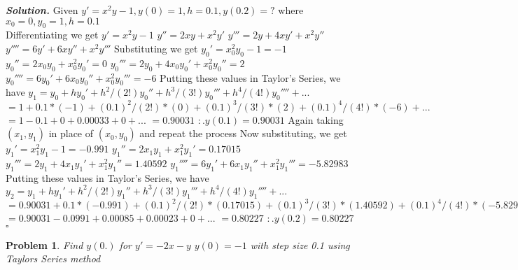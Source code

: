 \documentclass[12pt]{article}
\newtheorem{problem}{Problem}
\newenvironment{solution}[1][\it{Solution}]{\textbf{#1. } }{$\square$}
\begin{document}
\begin{solution}
    Given \(y'=x^2y-1, y(0)=1, h=0.1, y(0.2)=?\) where \(x_0=0,y_0=1,h=0.1\) \\ Differentiating we get \newline
    \(y'=x^2y-1\) \newline
    \(y''=2xy+x^2y'\) \newline
    \(y'''=2y+4xy'+x^2y''\) \newline
    \(y''''=6y'+6xy''+x^2y'''\) \newline
    Substituting we get 
    \(y_0'=x_0^2y_0-1=-1\) \newline
    \(y_0''=2x_0y_0+x_0^2y_0'=0\) \newline
    \(y_0'''=2y_0+4x_0y_0'+x_0^2y_0''=2\) \newline
    \(y_0''''=6y_0'+6x_0y_0''+x_0^2y_0'''=-6\) \newline    
    Putting these values in Taylor's Series, we have
    \(y_1 = y_0 + hy_0' + h^2/(2!) y_0'' + h^3/(3!) y_0''' + h^4/(4!) y_0'''' + ...\) \newline
    \(=1+0.1*(-1)+(0.1)^2/(2!)*(0)+(0.1)^3/(3!)*(2)+(0.1)^4/(4!)*(-6)+...\) \newline
    \(=1-0.1+0+0.00033+0+...\) \newline
    \(=0.90031\) \newline
    \(:.y(0.1)=0.90031\) \newline
    \hfill \break
    Again taking \((x_1,y_1)\) in place of \((x_0,y_0)\)  and repeat the process
    Now substituting, we get
    \(y_1'=x_1^2y_1-1=-0.991\) \newline
    \(y_1''=2x_1y_1+x_1^2y_1'=0.17015\) \newline
    \(y_1'''=2y_1+4x_1y_1'+x_1^2y_1''=1.40592\) \newline
    \(y_1''''=6y_1'+6x_1y_1''+x_1^2y_1'''=-5.82983\) \newline
    Putting these values in Taylor's Series, we have
    \(y_2 = y_1 + hy_1' + h^2/(2!) y_1'' + h^3/(3!) y_1''' + h^4/(4!) y_1'''' + ...\) \newline
    \(=0.90031+0.1*(-0.991)+(0.1)^2/(2!)*(0.17015)+(0.1)^3/(3!)*(1.40592)+(0.1)^4/(4!)*(-5.82983)+...\) \newline
    \(=0.90031-0.0991+0.00085+0.00023+0+...\) \newline
    \(=0.80227\) \newline
    \(:.y(0.2)=0.80227\) \newline
\end{solution}
\begin{problem}
    Find \(y(0.)\) for \(y'=-2x-y\) \(y(0)=-1\) with step size 0.1 using Taylors Series method
\end{problem}
\end{document}
